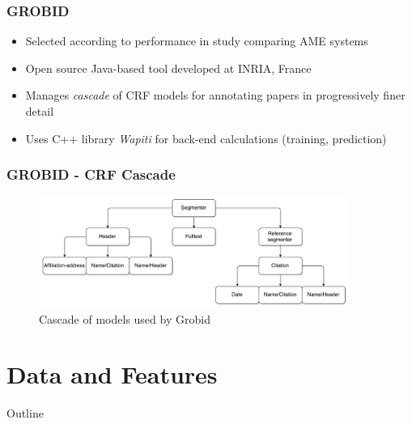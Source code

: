 \documentclass{beamer}
\begin{document}

\begin{frame}
\frametitle{GROBID}
\begin{itemize}
\item Selected according to performance in study comparing AME systems \cite{
lipinski2013evaluation}
\item Open source Java-based tool developed at INRIA, France
\item Manages \emph{cascade} of CRF models for annotating papers in progressively finer detail
\item Uses C++ library \emph{Wapiti} for back-end calculations (training, prediction)
\end{itemize}
\end{frame}


\begin{frame}
\frametitle{GROBID - CRF Cascade}
\begin{figure}[h]
\center
\includegraphics[width=4in]{Figures/cascade.pdf}
\caption{Cascade of models used by Grobid}
\end{figure}
\end{frame}


\section{Data and Features}


\begin{frame}[noframenumbering]{Outline}
\end{frame}

\end{document}
